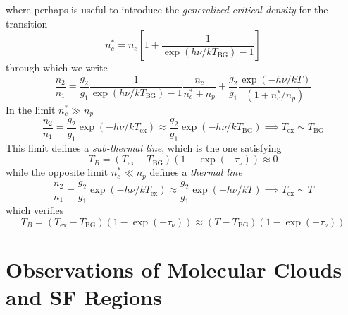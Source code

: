 where perhaps is useful to introduce the \emph{generalized critical density} for the transition
\begin{equation}
    n_{c}^{*} = n_{c}\left[1+\frac{1}{\exp(h\nu/kT_{\text{BG}})-1}\right]
    \label{eq:generalizedcriticaldensity}
\end{equation}
through which we write 
\begin{equation}
    \boxed{
    \frac{n_{2}}{n_{1}} = \frac{g_{2}}{g_{1}}\frac{1}{\exp(h\nu/kT_{\text{BG}})-1}\frac{n_{c}}{n_{c}^{*}+n_{p}}+\frac{g_{2}}{g_{1}}\frac{\exp\left(-h\nu/kT\right)}{\left(1+n_{c}^{*}/n_{p}\right)}
    }
\end{equation}
In the limit $n_{c}^{*}\gg n_{p}$
\begin{equation}
    \frac{n_{2}}{n_{1}} = \frac{g_{2}}{g_{1}}\exp\left(-h\nu/kT_{\text{ex}}\right) \approx \frac{g_{2}}{g_{1}}\exp\left(-h\nu/kT_{\text{BG}}\right) \implies T_{\text{ex}} \sim T_{\text{BG}}
\end{equation}
This limit defines a \emph{sub-thermal line}, which is the one satisfying 
\begin{equation}
    T_{B} = (T_{\text{ex}}-T_{\text{BG}})(1-\exp(-\tau_{\nu})) \approx 0
\end{equation}
while the opposite limit $n_{c}^{*}\ll n_{p}$ defines a \emph{thermal line}
\begin{equation}
    \frac{n_{2}}{n_{1}} = \frac{g_{2}}{g_{1}}\exp\left(-h\nu/kT_{\text{ex}}\right) \approx \frac{g_{2}}{g_{1}}\exp\left(-h\nu/kT\right) \implies T_{\text{ex}} \sim T
\end{equation}
which verifies 
\begin{equation}
    T_{B} = (T_{\text{ex}}-T_{\text{BG}})(1-\exp(-\tau_{\nu})) \approx (T-T_{\text{BG}})(1-\exp(-\tau_{\nu})) 
\end{equation}

\section{Observations of Molecular Clouds and SF Regions}

